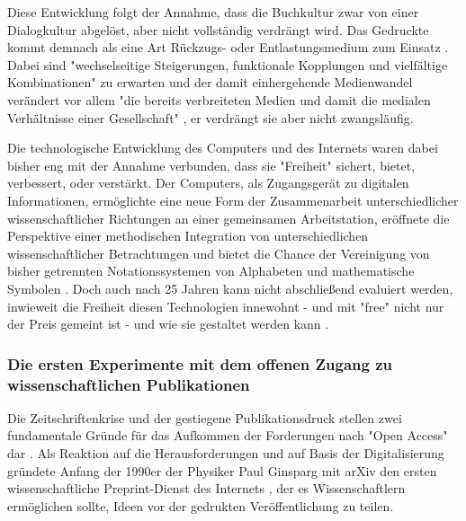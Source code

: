 Diese Entwicklung folgt der Annahme, dass die Buchkultur zwar von einer Dialogkultur abgelöst, aber nicht vollständig verdrängt wird. Das Gedruckte kommt demnach als eine Art Rückzugs- oder Entlastungsmedium zum Einsatz \cite{hagner_2015_sache_buches}. Dabei sind "wechselseitige Steigerungen, funktionale Kopplungen und vielfältige Kombinationen" zu erwarten und der damit einhergehende Medienwandel verändert vor allem "die bereits verbreiteten Medien und damit die medialen Verhältnisse einer Gesellschaft" \cite{Koenen_1997}, er verdrängt sie aber nicht zwangsläufig.

Die technologische Entwicklung des Computers und des Internets waren dabei bisher eng mit der Annahme verbunden, dass sie "Freiheit" sichert, bietet, verbessert, oder verstärkt. Der Computers, als Zugangsgerät zu digitalen Informationen, ermöglichte eine neue Form der Zusammenarbeit unterschiedlicher wissenschaftlicher Richtungen an einer gemeinsamen Arbeitstation, eröffnete die Perspektive einer methodischen Integration von unterschiedlichen wissenschaftlicher Betrachtungen und bietet die Chance der Vereinigung von bisher getrennten Notationssystemen von Alphabeten und mathematische Symbolen \cite{kittler_2004}. Doch auch nach 25 Jahren kann nicht abschließend evaluiert werden, inwieweit die Freiheit diesen Technologien innewohnt - und mit "free" nicht nur der Preis gemeint ist \cite{stallman2002} - und wie sie gestaltet werden kann \cite{kelty_2014_freedom}.

\subsubsection{Die ersten Experimente mit dem offenen Zugang zu wissenschaftlichen Publikationen}

Die Zeitschriftenkrise und der gestiegene Publikationsdruck stellen zwei fundamentale Gründe für das Aufkommen der Forderungen nach "Open Access" dar \cite{Brintzinger_2010} \cite{suchen}. Als Reaktion auf die Herausforderungen und auf Basis der Digitalisierung gründete Anfang der 1990er der Physiker Paul Ginsparg mit arXiv den ersten wissenschaftliche Preprint-Dienst des Internets \cite{suchen}, der es Wissenschaftlern ermöglichen sollte, Ideen vor der gedrukten Veröffentlichung zu teilen.

